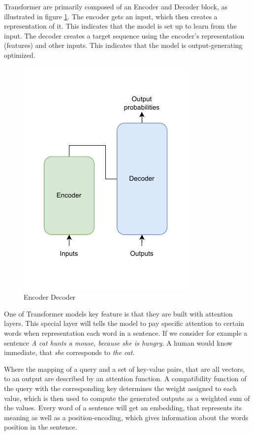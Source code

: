 Transformer are primarily composed of an Encoder and Decoder block, as illustrated in figure \ref{fig:encoderDecoder}.
The encoder gets an input, which then creates a representation of it.
This indicates that the model is set up to learn from the input.
The decoder creates a target sequence using the encoder's representation (features) and other inputs. 
This indicates that the model is output-generating optimized.

\begin{figure}[h]
    \centering
    \includegraphics[width=0.5\linewidth]{Abschlussarbeit/Pictures/EncoderDecoder.pdf}
    \caption{Encoder Decoder}
    \label{fig:encoderDecoder}
\end{figure}

One of Transformer models key feature is that they are built with attention layers.
This special layer will tells the model to pay specific attention to certain words when representation each word in a sentence. 
If we consider for example a sentence \textit{A cat hunts a mouse, because she is hungry}.
A human would know immediate, that \textit{she} corresponds to \textit{the cat}. 



Where the mapping of a query and a set of key-value pairs, that are all vectors, to an output are described by an attention function.
A compatibility function of the query with the corresponding key determines the weight assigned to each value, which is then used to compute the generated outputs as a weighted sum of the values.
Every word of a sentence will get an embedding, that represents its meaning as well as a position-encoding, which gives information about the words position in the sentence.

